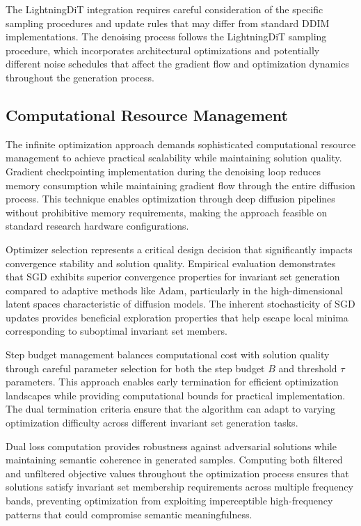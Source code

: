 The LightningDiT integration requires careful consideration of the specific sampling procedures and update rules that may differ from standard DDIM implementations. The denoising process follows the LightningDiT sampling procedure, which incorporates architectural optimizations and potentially different noise schedules that affect the gradient flow and optimization dynamics throughout the generation process.

\subsection{Computational Resource Management}

The infinite optimization approach demands sophisticated computational resource management to achieve practical scalability while maintaining solution quality. Gradient checkpointing implementation during the denoising loop reduces memory consumption while maintaining gradient flow through the entire diffusion process. This technique enables optimization through deep diffusion pipelines without prohibitive memory requirements, making the approach feasible on standard research hardware configurations.

Optimizer selection represents a critical design decision that significantly impacts convergence stability and solution quality. Empirical evaluation demonstrates that SGD exhibits superior convergence properties for invariant set generation compared to adaptive methods like Adam, particularly in the high-dimensional latent spaces characteristic of diffusion models. The inherent stochasticity of SGD updates provides beneficial exploration properties that help escape local minima corresponding to suboptimal invariant set members.

Step budget management balances computational cost with solution quality through careful parameter selection for both the step budget $B$ and threshold $\tau$ parameters. This approach enables early termination for efficient optimization landscapes while providing computational bounds for practical implementation. The dual termination criteria ensure that the algorithm can adapt to varying optimization difficulty across different invariant set generation tasks.

Dual loss computation provides robustness against adversarial solutions while maintaining semantic coherence in generated samples. Computing both filtered and unfiltered objective values throughout the optimization process ensures that solutions satisfy invariant set membership requirements across multiple frequency bands, preventing optimization from exploiting imperceptible high-frequency patterns that could compromise semantic meaningfulness.

